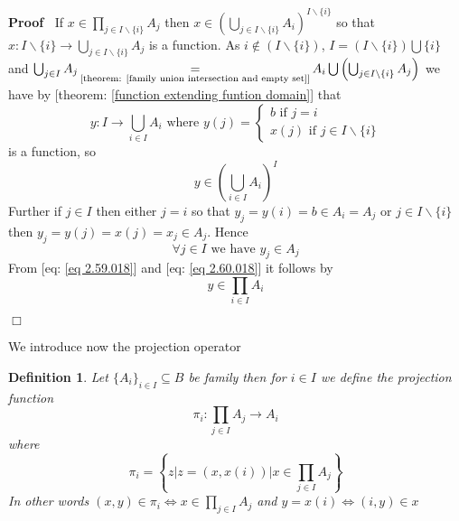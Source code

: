\documentclass{book}
\newcommand{\equallim}{\mathop{=}\limits}
\newcommand{\nin}{\not\in}
\newenvironment{proof}{\noindent\textbf{Proof\ }}{\hspace*{\fill}$\Box$\medskip}
\newtheorem{definition}{Definition}
{\theorembodyfont{\rmfamily}\newtheorem{example}{Example}}
\begin{document}
\begin{proof}
  If $x \in \prod_{j \in I\backslash \{ i \}} A_j$ then $x \in \left(
  \bigcup_{j \in I\backslash \{ i \}} A_i \right)^{I\backslash \{ i \}}$ so
  that $x : I\backslash \{ i \} \rightarrow \bigcup_{j \in I\backslash \{ i
  \}} A_j$ is a function. As $i \nin (I\backslash \{ i \})$, $I = (I\backslash
  \{ i \}) \bigcup \{ i \}$ and $\bigcup_{j \in I} A_j
  \equallim_{\text{[theorem: \ref{family union intersection and empty set}]}}
  A_i \bigcup \left( \bigcup_{j \in I\backslash \{ i \}} A_j \right)$ we have
  by [theorem: \ref{function extending funtion domain}] that
  \[ y : I \rightarrow \bigcup_{i \in I} A_i \text{ where } y (j) =
     \left\{\begin{array}{l}
       b \text{ if } j = i\\
       x (j) \text{ if } j \in I\backslash \{ i \}
     \end{array}\right. \]
  is a function, so
  \begin{equation}
    \label{eq 2.59.018} y \in \left( \bigcup_{i \in I} A_i \right)^I
  \end{equation}
  Further if $j \in I$ then either $j = i$ so that $y_j = y (i) = b \in A_i =
  A_j$ or $j \in I\backslash \{ i \}$ then $y_j = y (j) = x (j) = x_j \in
  A_j$. Hence
  \begin{equation}
    \label{eq 2.60.018} \forall j \in I \text{ we have } y_j \in A_j
  \end{equation}
  From [eq: \ref{eq 2.59.018}] and [eq: \ref{eq 2.60.018}] it follows by
  \[ y \in \prod_{i \in I} A_i \]
  
\end{proof}

We introduce now the projection operator

\begin{definition}
  \label{product projection function}{}Let $\{ A_i \}_{i \in I}
  \subseteq B$ be family then for $i \in I$ we define the projection function
  \[ \pi_i : \prod_{j \in I} A_j \rightarrow A_i \]
  where
  \[ \pi_i = \left\{ z|z = (x, x (i)) |x \in \prod_{j \in I} A_j \right\} \]
  In other words $(x, y) \in \pi_i \Leftrightarrow x \in \prod_{j \in I} A_j$
  and $y = x (i) \Leftrightarrow (i, y) \in x$
\end{definition}
\end{document}
